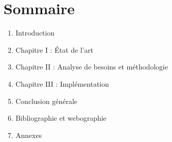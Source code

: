 \documentclass[12pt,a4paper]{report}
\begin{document}







\renewcommand{\listfigurename}{Liste des figures}
\listoffigures
\clearpage

\renewcommand{\listtablename}{Liste des tableaux}
\listoftables
\clearpage




\chapter*{Sommaire}
\begin{enumerate}
  \item[] Introduction
  \item[] Chapitre I : État de l'art
  \item[] Chapitre II : Analyse de besoins et méthodologie
  \item[] Chapitre III : Implémentation
  \item[] Conclusion générale
  \item[] Bibliographie et webographie
  \item[] Annexes
\end{enumerate}
\clearpage








\clearpage
{}
\renewcommand{\bibname}{Bibliographie}





\appendix


\clearpage
\renewcommand{\contentsname}{Table des matières}
\tableofcontents
\end{document}
